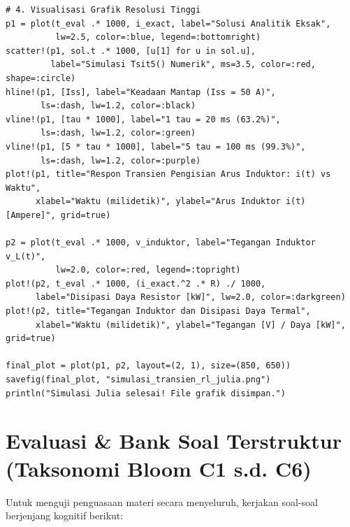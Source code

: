 \documentclass[11pt,a4paper]{article}
\theoremstyle{definition}
\begin{document}
\begin{lstlisting}[style=juliastyle, caption={Skrip Julia: Simulasi Transien Rangkaian RL dan Verifikasi Numerik Menggunakan DifferentialEquations.jl.}]
# 4. Visualisasi Grafik Resolusi Tinggi
p1 = plot(t_eval .* 1000, i_exact, label="Solusi Analitik Eksak",
          lw=2.5, color=:blue, legend=:bottomright)
scatter!(p1, sol.t .* 1000, [u[1] for u in sol.u],
         label="Simulasi Tsit5() Numerik", ms=3.5, color=:red, shape=:circle)
hline!(p1, [Iss], label="Keadaan Mantap (Iss = 50 A)",
       ls=:dash, lw=1.2, color=:black)
vline!(p1, [tau * 1000], label="1 tau = 20 ms (63.2%)",
       ls=:dash, lw=1.2, color=:green)
vline!(p1, [5 * tau * 1000], label="5 tau = 100 ms (99.3%)",
       ls=:dash, lw=1.2, color=:purple)
plot!(p1, title="Respon Transien Pengisian Arus Induktor: i(t) vs Waktu",
      xlabel="Waktu (milidetik)", ylabel="Arus Induktor i(t) [Ampere]", grid=true)

p2 = plot(t_eval .* 1000, v_induktor, label="Tegangan Induktor v_L(t)",
          lw=2.0, color=:red, legend=:topright)
plot!(p2, t_eval .* 1000, (i_exact.^2 .* R) ./ 1000,
      label="Disipasi Daya Resistor [kW]", lw=2.0, color=:darkgreen)
plot!(p2, title="Tegangan Induktor dan Disipasi Daya Termal",
      xlabel="Waktu (milidetik)", ylabel="Tegangan [V] / Daya [kW]", grid=true)

final_plot = plot(p1, p2, layout=(2, 1), size=(850, 650))
savefig(final_plot, "simulasi_transien_rl_julia.png")
println("Simulasi Julia selesai! File grafik disimpan.")
\end{lstlisting}


\section{Evaluasi \& Bank Soal Terstruktur (Taksonomi Bloom C1 s.d. C6)}

Untuk menguji penguasaan materi secara menyeluruh, kerjakan soal-soal berjenjang kognitif berikut:
\end{document}

